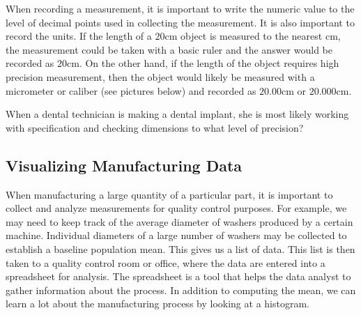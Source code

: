 \documentclass{ximera}
\begin{document}
\begin{question}\label{q:equalLength}
When recording a measurement, it is important to write the numeric value to the level of decimal points used in collecting the measurement. It is also important to record the units.  If the length of a $20$cm object is measured to the nearest cm, the measurement could be taken with a basic ruler and the answer would be recorded as $20$cm.  On the other hand, if the length of the object requires high precision measurement, then the object would likely be measured with a micrometer or caliber (see pictures below) and recorded as $20.00$cm or $20.000$cm.

\begin{center}
      \end{center}

When a dental technician is making a dental implant, she is most likely working with specification and checking dimensions to what level of precision?
\begin{multipleChoice} 
\end{multipleChoice} 
\end{question}

\subsection*{Visualizing Manufacturing Data}

When manufacturing a large quantity of a particular part, it is important to collect and analyze measurements for quality control purposes.  For example, we may need to keep track of the average diameter of washers produced by a certain machine.  Individual diameters of a large number of washers may be collected to establish a baseline population mean.  This gives us a list of data.  This list is then taken to a quality control room or office, where the data are entered into a spreadsheet for analysis. The spreadsheet is a tool that helps the data analyst to gather information about the process. In addition to computing the mean, we can learn a lot about the manufacturing process by looking at a histogram.  
\end{document}
